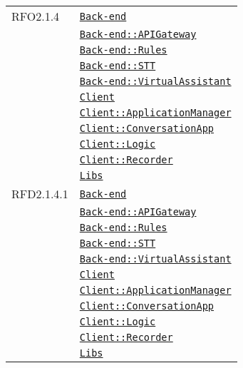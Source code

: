 \begin{longtable}{|>{\centering}m{3cm}|m{10cm}<{\centering}|}
RFO2.1.4 & \hyperref[Back-end]{\texttt{Back-end}}\\
& \hyperref[Back-end::APIGateway]{\texttt{Back-end::APIGateway}}\\
& \hyperref[Back-end::Rules]{\texttt{Back-end::Rules}}\\
& \hyperref[Back-end::STT]{\texttt{Back-end::STT}}\\
& \hyperref[Back-end::VirtualAssistant]{\texttt{Back-end::VirtualAssistant}}\\
& \hyperref[Client]{\texttt{Client}}\\
& \hyperref[Client::ApplicationManager]{\texttt{Client::ApplicationManager}}\\
& \hyperref[Client::ConversationApp]{\texttt{Client::ConversationApp}}\\
& \hyperref[Client::Logic]{\texttt{Client::Logic}}\\
& \hyperref[Client::Recorder]{\texttt{Client::Recorder}}\\
& \hyperref[Libs]{\texttt{Libs}}\\ \hline

RFD2.1.4.1 & \hyperref[Back-end]{\texttt{Back-end}}\\
& \hyperref[Back-end::APIGateway]{\texttt{Back-end::APIGateway}}\\
& \hyperref[Back-end::Rules]{\texttt{Back-end::Rules}}\\
& \hyperref[Back-end::STT]{\texttt{Back-end::STT}}\\
& \hyperref[Back-end::VirtualAssistant]{\texttt{Back-end::VirtualAssistant}}\\
& \hyperref[Client]{\texttt{Client}}\\
& \hyperref[Client::ApplicationManager]{\texttt{Client::ApplicationManager}}\\
& \hyperref[Client::ConversationApp]{\texttt{Client::ConversationApp}}\\
& \hyperref[Client::Logic]{\texttt{Client::Logic}}\\
& \hyperref[Client::Recorder]{\texttt{Client::Recorder}}\\
& \hyperref[Libs]{\texttt{Libs}}\\ \hline


\end{longtable}
